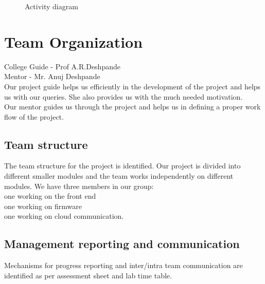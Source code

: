 \documentclass[oneside,a4paper,12pt]{report}
\begin{document}
\begin{center}
	\begin{figure}[!htbp]
		\centering
	  \caption{Activity diagram}
	  \label{fig:act-dig}
	\end{figure}
\end{center}  



 
\section{Team Organization}
College Guide - Prof A.R.Deshpande\\
Mentor - Mr. Anuj Deshpande \\

Our project guide helps us efficiently in the development of the project and helps us with our queries.
She also provides us with the much needed motivation.\\
Our mentor guides us through the project and helps us in defining a proper work flow of the project.\\ 

\subsection{Team structure}
The team structure for the project is identified.
Our project is divided into different smaller modules and the team works independently on  different modules.
We have three members in our group:\\
one working on the front end\\
one working on firmware\\
one working on cloud communication.\\

\subsection{Management reporting and communication}
Mechanisms for progress reporting and inter/intra team communication are identified as per assessment sheet and lab time table. 
\end{document}
